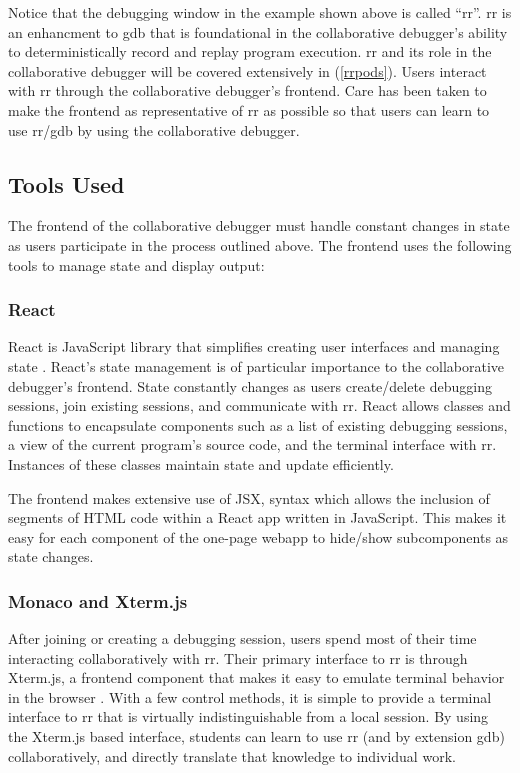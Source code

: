 \documentclass[12pt]{article}
\begin{document}
Notice that the debugging window in the example shown above is called
``rr''.  rr is an enhancment to gdb that is foundational in the
collaborative debugger's ability to deterministically record and
replay program execution. rr and its role in the collaborative
debugger will be covered extensively in (\ref{rrpods}).  Users
interact with rr through the collaborative debugger's frontend.  Care
has been taken to make the frontend as representative of rr as
possible so that users can learn to use rr/gdb by using the
collaborative debugger.

\subsection{Tools Used}

The frontend of the collaborative debugger must handle constant
changes in state as users participate in the process outlined above.
The frontend uses the following tools to manage state and display
output:

\subsubsection{React}\label{react}

React is JavaScript library that simplifies creating user interfaces
and managing state \cite{react}.  React's state management is of
particular importance to the collaborative debugger's frontend.  State
constantly changes as users create/delete debugging sessions, join
existing sessions, and communicate with rr.  React allows classes and
functions to encapsulate components such as a list of existing
debugging sessions, a view of the current program's source code, and
the terminal interface with rr.  Instances of these classes maintain
state and update efficiently.
\par

The frontend makes extensive use of JSX, syntax which allows the
inclusion of segments of HTML code within a React app written in
JavaScript.  This makes it easy for each component of the one-page
webapp to hide/show subcomponents as state changes.

\subsubsection{Monaco and Xterm.js}\label{xtermjs/monaco}

After joining or creating a debugging session, users spend most of
their time interacting collaboratively with rr.  Their primary
interface to rr is through Xterm.js, a frontend component that makes
it easy to emulate terminal behavior in the browser \cite{xtermjs}.
With a few control methods, it is simple to provide a terminal
interface to rr that is virtually indistinguishable from a local
session.  By using the Xterm.js based interface, students can learn to
use rr (and by extension gdb) collaboratively, and directly translate
that knowledge to individual work.
\par
\end{document}
